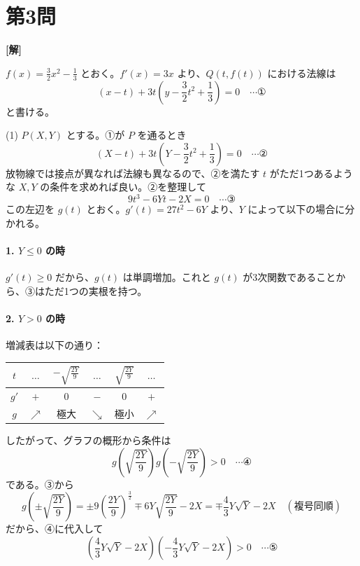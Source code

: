 \documentclass[../main.tex]{subfiles}
\begin{document}
\newpage

\section*{第3問}

\noindent
\textbf{[解]}

$f(x) = \frac{3}{2}x^2 - \frac{1}{3}$ とおく。$f'(x) = 3x$ より、$Q\left(t, f(t)\right)$ における法線は
\[
  (x-t) + 3t \left( y - \frac{3}{2}t^2 + \frac{1}{3} \right) = 0 \quad \cdots \text{①}
\]
と書ける。

\medskip
\noindent
(1) $P(X, Y)$ とする。①が $P$ を通るとき
\[
  (X-t) + 3t \left( Y - \frac{3}{2}t^2 + \frac{1}{3} \right) = 0 \quad \cdots \text{②}
\]
放物線では接点が異なれば法線も異なるので、②を満たす $t$ がただ1つあるような $X, Y$ の条件を求めれば良い。②を整理して
\[
  9t^3 - 6Yt - 2X = 0 \quad \cdots \text{③}
\]
この左辺を $g(t)$ とおく。$g'(t) = 27t^2 - 6Y$ より、$Y$ によって以下の場合に分かれる。

\paragraph{1. $Y \le 0$ の時}
$g'(t) \ge 0$ だから、$g(t)$ は単調増加。これと $g(t)$ が3次関数であることから、③はただ1つの実根を持つ。

\paragraph{2. $Y > 0$ の時}
増減表は以下の通り：
\begin{center}
  \begin{tabular}{c|ccccc}
    $t$ & $\dots$ & $-\sqrt{\frac{2Y}{9}}$ & $\dots$ & $\sqrt{\frac{2Y}{9}}$ & $\dots$ \\
    \hline
    $g'$ & $+$ & $0$ & $-$ & $0$ & $+$ \\
    \hline
    $g$ & $\nearrow$ & 極大 & $\searrow$ & 極小 & $\nearrow$
  \end{tabular}
\end{center}

したがって、グラフの概形から条件は
\[
  g\left(\sqrt{\frac{2Y}{9}}\right) g\left(-\sqrt{\frac{2Y}{9}}\right) > 0 \quad \cdots \text{④}
\]
である。③から
\[
  g\left(\pm \sqrt{\frac{2Y}{9}}\right) = \pm 9 \left(\frac{2Y}{9}\right)^{\frac{3}{2}} \mp 6Y \sqrt{\frac{2Y}{9}} - 2X = \mp \frac{4}{3}Y\sqrt{Y} - 2X \quad (\text{複号同順})
\]
だから、④に代入して
\[
  \left( \frac{4}{3}Y\sqrt{Y} - 2X \right) \left( -\frac{4}{3}Y\sqrt{Y} - 2X \right) > 0 \quad \cdots \text{⑤}
\]
\end{document}
